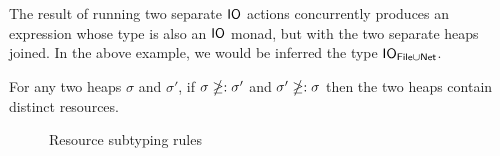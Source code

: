 The result of running two separate $\mathsf{IO}$ actions concurrently produces
an expression whose type is also an $\mathsf{IO}$ monad, but with the two
separate heaps joined. In the above example, we would be inferred the
type $\mathsf{IO}_{\textsf{File} \cup \textsf{Net}}$.

\begin{lemma}
  For any two heaps $\sigma$ and $\sigma'$, if $\sigma \ngeq: \sigma'$ and $\sigma'
  \ngeq: \sigma$ then the two heaps contain distinct resources.
\end{lemma}

\begin{figure}


\caption{Resource subtyping rules}
\label{fig:subtyping}
\end{figure}


